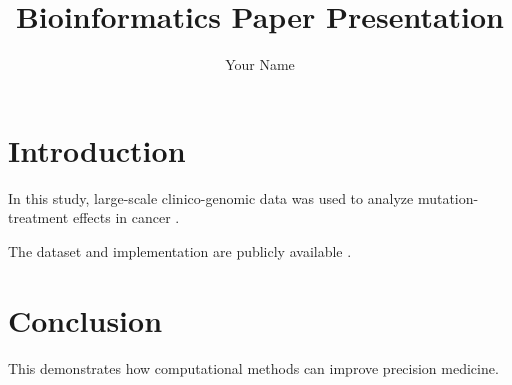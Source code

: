 \documentclass{article}
\begin{document}
\title{Bioinformatics Paper Presentation}

\author{Your Name}

\date{}

\maketitle

\section{Introduction}

In this study, large-scale clinico-genomic data was used to analyze mutation-treatment effects in cancer \cite{liu2024_mutation_treatment_effects}.

The dataset and implementation are publicly available \cite{liu2024_precision_cancer2023}.

\section{Conclusion}

This demonstrates how computational methods can improve precision medicine.



\end{document}
